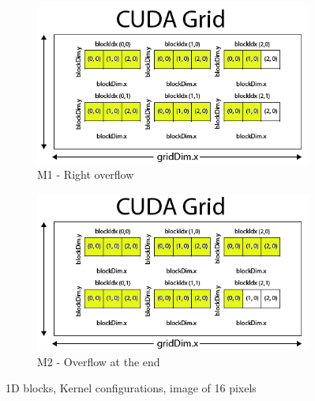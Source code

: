 \documentclass[a4paper]{article}
\begin{document}
\begin{figure}[!ht]
\begin{subfigure}{0.5\textwidth}
\centering
\includegraphics[width=\linewidth]{res/M1}
\caption{M1 - Right overflow}
\label{fig:m1}
\end{subfigure} %
\begin{subfigure}{0.5\textwidth}
\centering
\includegraphics[width=\linewidth]{res/M2}
\caption{M2 - Overflow at the end}
\label{fig:m2}
\end{subfigure}
\caption{1D blocks, Kernel configurations, image of 16 pixels}
 \label{fig:methods12}
\end{figure}
\FloatBarrier
\end{document}
